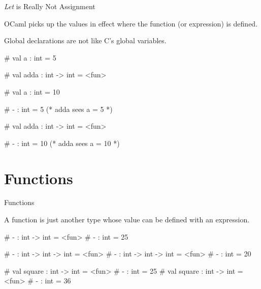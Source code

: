 \documentclass{plt}
\begin{document}
\begin{frame}[fragile]{\emph{Let} is Really Not Assignment}

OCaml picks up the values in effect where the function (or expression)
is defined.

\alert{Global declarations are not like C's global variables.}

\begin{interactive}
# 
val a : int = 5

# 
val adda : int -> int = <fun>

# 
val a : int = 10

# 
- : int = 5        \alert{(* adda sees a = 5 *)}

# 
val adda : int -> int = <fun>

# 
- : int = 10       \alert{(* adda sees a = 10 *)}
\end{interactive}

\end{frame}

\part{Functions}
\frame{\partpage}

\begin{frame}[fragile]{Functions}

  A function is just another type whose value can be defined with an
  expression.

\begin{interactive}
# 
- : int -> int = <fun>
# 
- : int = 25

# 
- : int -> int -> int = <fun>
# 
- : int -> int -> int = <fun>
# 
- : int = 20

# 
val square : int -> int = <fun>
# 
- : int = 25
# 
val square : int -> int = <fun>
# 
- : int = 36
\end{interactive}
\end{frame}
\end{document}
